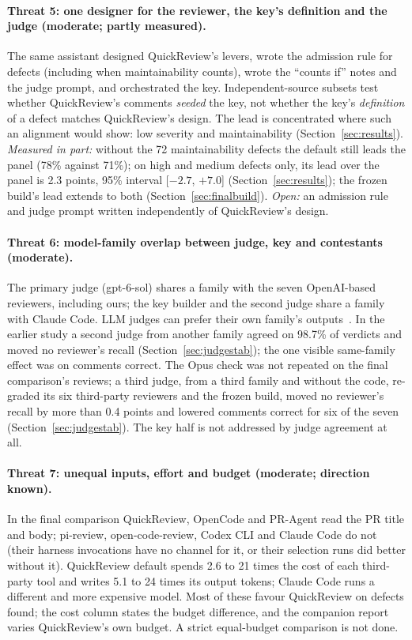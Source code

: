 \documentclass[11pt,a4paper]{article}
\newcommand{\qcr}{QuickReview}
\begin{document}
\paragraph{Threat 5: one designer for the reviewer, the key's definition and the judge (moderate; partly measured).}
The same assistant designed \qcr{}'s levers, wrote the admission rule for
defects (including when maintainability counts), wrote the ``counts if''
notes and the judge prompt, and orchestrated the key. Independent-source
subsets test whether \qcr{}'s comments \emph{seeded} the key, not whether
the key's \emph{definition} of a defect matches \qcr{}'s design. The lead is
concentrated where such an alignment would show: low severity and
maintainability (Section~\ref{sec:results}). \emph{Measured in part:}
without the 72 maintainability defects the default still leads the panel
(78\% against 71\%); on high and medium defects only, its lead over the panel
is 2.3 points, 95\% interval [$-2.7$, $+7.0$] (Section~\ref{sec:results}); the
frozen build's lead extends to both (Section~\ref{sec:finalbuild}). \emph{Open:} an admission rule and judge prompt written
independently of \qcr{}'s design.

\paragraph{Threat 6: model-family overlap between judge, key and contestants (moderate).}
The primary judge (gpt-6-sol) shares a family with the seven OpenAI-based
reviewers, including ours; the key builder and the second judge share a
family with Claude Code. LLM judges can prefer their own family's
outputs~\cite{panickssery2024,zheng2023}. In the earlier study a second
judge from another family agreed on 98.7\% of verdicts and moved no
reviewer's recall (Section~\ref{sec:judgestab}); the one visible same-family
effect was on comments correct. The Opus check was not repeated on the
final comparison's reviews; a third judge, from a third family and without
the code, re-graded its six third-party reviewers and the frozen build,
moved no reviewer's recall by more than 0.4 points and lowered comments
correct for six of the seven (Section~\ref{sec:judgestab}). The key half is
not addressed by judge agreement at all.

\paragraph{Threat 7: unequal inputs, effort and budget (moderate; direction known).}
In the final comparison \qcr{}, OpenCode and PR-Agent read the PR title and
body; pi-review, open-code-review, Codex CLI and Claude Code do not (their
harness invocations have no channel for it, or their selection runs did
better without it). \qcr{} default spends 2.6 to 21 times the cost of each
third-party tool and writes 5.1 to 24 times its output tokens; Claude Code
runs a different and more expensive model. Most of these favour \qcr{} on
defects found; the cost column states the budget difference, and the
companion report~\cite{qcrreport} varies \qcr{}'s own budget. A strict
equal-budget comparison is not done.
\end{document}
